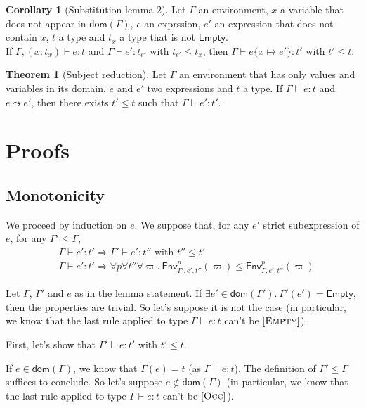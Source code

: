 \documentclass[a4paper]{article}%
\newcommand{\dom}[1]{\textsf{dom}(#1)}
\newcommand{\Empty} {\textsf{Empty}}%
\newcommand{\subst}[2]{\{#1 \mapsto #2\}}
\newcommand{\Gp}[2]{\textsf{Env}^{#1}_{#2}}
\theoremstyle{definition}
\newtheorem{theorem}{Theorem}
\newtheorem{corollary}{Corollary}
\newcommand {\Rule}[1] {[\textsc{#1}]}
\begin{document}
    \begin{corollary}[Substitution lemma 2]
      Let $\Gamma$ an environment, $x$ a variable that does not appear in $\dom \Gamma$, $e$ an exprssion, $e'$ an expression that does not contain $x$, $t$ a type and $t_x$ a type that is not $\Empty$.\\
      If $\Gamma, (x:t_x) \vdash e:t$ and $\Gamma \vdash e':t_{e'}$ with $t_{e'} \leq t_x$, then $\Gamma \vdash e \subst x {e'}:t'$ with $t'\leq t$.
    \end{corollary}

    \begin{theorem}[Subject reduction]
      Let $\Gamma$ an environment that has only values and variables in its domain, $e$ and $e'$ two expressions and $t$ a type.
      If $\Gamma \vdash e : t$ and $e \leadsto e'$, then there exists $t' \leq t$ such that $\Gamma \vdash e' : t'$.
    \end{theorem}

    \section{Proofs}

    \subsection{Monotonicity}

    We proceed by induction on $e$. We suppose that, for any $e'$ strict subexpression of $e$, for any $\Gamma' \leq \Gamma$,
    \begin{align*}
      &\Gamma \vdash e':t' \Rightarrow \Gamma' \vdash e':t'' \text{ with } t'' \leq t'\\
      &\Gamma \vdash e':t' \Rightarrow \forall p \forall t'' \forall \varpi.\ \Gp p {\Gamma',e',t''} (\varpi) \leq \Gp p {\Gamma,e',t''} (\varpi)
    \end{align*}

    Let $\Gamma$, $\Gamma'$ and $e$ as in the lemma statement.
    If $\exists e' \in \dom {\Gamma'}.\ \Gamma'(e') = \Empty$, then the properties are trivial.
    So let's suppose it is not the case (in particular, we know that the last rule applied to type $\Gamma \vdash e:t$ can't be $\Rule{Empty}$).

    First, let's show that $\Gamma' \vdash e:t' \text{ with } t' \leq t$.

    If $e\in\dom\Gamma$, we know that $\Gamma(e)=t$ (as $\Gamma \vdash e:t$). The definition of $\Gamma' \leq \Gamma$ suffices to conclude.
    So let's suppose $e\not\in\dom\Gamma$ (in particular, we know that the last rule applied to type $\Gamma \vdash e:t$ can't be $\Rule{Occ}$).
\end{document}
